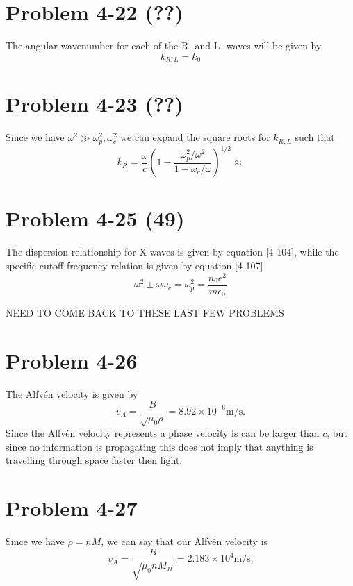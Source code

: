 \section*{Problem 4-22 (??)}
\label{sec:4-22}
The angular wavenumber for each of the R- and L- waves will be given by
\begin{equation*}
	k_{R,L} = k_0
\end{equation*}


\section*{Problem 4-23 (??)}
\label{sec:4-23}
Since we have \(\omega^2 \gg \omega_p^2,\omega^2_c \) we can expand the square roots for \(k_{R,L} \) such that
\begin{equation*}
	k_R = \dfrac{\omega}{c}\left(1 - \dfrac{\omega_p^2/\omega^2}{1 - \omega_c/\omega} \right)^{1/2} \approx
\end{equation*}

\section*{Problem 4-25 (49)}
\label{sec:4-25}
The dispersion relationship for X-waves is given by equation [4-104], while the specific cutoff frequency relation is given by equation [4-107]
\begin{equation*}
	\omega^2 \pm \omega\omega_c = \omega_p^2 = \dfrac{n_0e^2}{m\epsilon_0}
\end{equation*}

NEED TO COME BACK TO THESE LAST FEW PROBLEMS

\section*{Problem 4-26}
\label{sec:4-26}
The Alfv\'en velocity is given by
\begin{equation*}
	v_A = \dfrac{B}{\sqrt{\mu_0\rho}} = 8.92 \times 10^{-6}\text{m/s}.
\end{equation*}
Since the Alfv\'en velocity represents a phase velocity is can be larger than \(c\), but since no information is propagating this does not imply that anything is travelling through space faster then light. 

\section*{Problem 4-27}
\label{sec:4-27}
Since we have \(\rho = nM \), we can say that our Alfv\'en velocity is 
\begin{equation*}
v_A = \dfrac{B}{\sqrt{\mu_0nM_H}} = 2.183 \times 10^{4}\text{m/s}.
\end{equation*}


